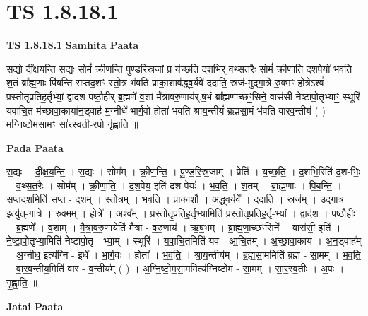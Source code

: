 \documentclass[17pt]{extarticle}
\begin{document}
\section{ TS 1.8.18.1 }

\textbf{TS 1.8.18.1 } \newline
\textbf{Samhita Paata} \newline

स॒द्यो दी᳚क्षयन्ति स॒द्यः सोमं॑ क्रीणन्ति पुण्डरिस्र॒जां प्र य॑च्छति द॒शभि॑र् वथ्सत॒रैः सोमं॑ क्रीणाति दश॒पेयो॑ भवति श॒तं ब्रा᳚ह्म॒णाः पि॑बन्ति सप्तद॒शꣳ स्तो॒त्रं भ॑वति प्राका॒शाव॑द्ध्व॒र्यवे॑ ददाति॒ स्रज॑-मुद्गा॒त्रे रु॒क्मꣳ होत्रेऽश्वं॑ प्रस्तोतृप्रतिह॒र्तृभ्यां॒ द्वाद॑श पष्ठौ॒हीर् ब्र॒ह्मणे॑ व॒शां मै᳚त्रावरु॒णाय॑र्.ष॒भं ब्रा᳚ह्मणाच्छꣳ॒॒सिने॒ वास॑सी नेष्टापो॒तृभ्याꣳ॒॒ स्थूरि॑ यवाचि॒त-म॑च्छावा॒काया॑न॒ड्वाह॑-म॒ग्नीधे॑ भार्ग॒वो होता॑ भवति श्राय॒न्तीयं॑ ब्रह्मसा॒मं भ॑वति वारव॒न्तीय॑ ( ) मग्निष्टोमसा॒मꣳ सा॑रस्व॒ती-र॒पो गृ॑ह्णाति ॥ \newline

\textbf{Pada Paata} \newline

स॒द्यः । दी॒क्ष॒य॒न्ति॒ । स॒द्यः । सोम᳚म् । क्री॒ण॒न्ति॒ । पु॒ण्ड॒रि॒स्र॒जाम् । प्रेति॑ । य॒च्छ॒ति॒ । द॒शभि॒रिति॑ द॒श-भिः॒ । व॒थ्स॒त॒रैः । सोम᳚म् । क्री॒णा॒ति॒ । द॒श॒पेय॒ इति॑ दश-पेयः॑ । भ॒व॒ति॒ । श॒तम् । ब्रा॒ह्म॒णाः । पि॒ब॒न्ति॒ । स॒प्त॒द॒शमिति॑ सप्त - द॒शम् । स्तो॒त्रम् । भ॒व॒ति॒ । प्रा॒का॒शौ । अ॒द्ध्व॒र्यवे᳚ । द॒दा॒ति॒ । स्रज᳚म् । उ॒द्गा॒त्र इत्यु॑त्-गा॒त्रे । रु॒क्मम् । होत्रे᳚ । अश्व᳚म् । प्र॒स्तो॒तृ॒प्र॒ति॒ह॒र्तृभ्या॒मिति॑ प्रस्तोतृप्रतिह॒र्तृ-भ्यां॒ । द्वाद॑श । प॒ष्ठौ॒हीः । ब्र॒ह्मणे᳚ । व॒शाम् । मै॒त्रा॒व॒रु॒णायेति॑ मैत्रा - व॒रु॒णाय॑ । ऋ॒ष॒भम् । ब्रा॒ह्म॒णा॒च्छꣳ॒॒सिने᳚ । वास॑सी॒ इति॑ । ने॒ष्टा॒पो॒तृभ्या॒मिति॑ नेष्टापो॒तृ - भ्या॒म् । स्थूरि॑ । य॒वा॒चि॒तमिति॑ यव - आ॒चि॒तम् । अ॒च्छा॒वा॒काय॑ । अ॒न॒ड्वाह᳚म् । अ॒ग्नीध॒ इत्य॑ग्नि - इधे᳚ । भा॒र्ग॒वः । होता᳚ । भ॒व॒ति॒ । श्रा॒य॒न्तीय᳚म् । ब्र॒ह्म॒सा॒ममिति॑ ब्रह्म - सा॒मम् । भ॒व॒ति॒ । वा॒र॒व॒न्तीय॒मिति॑ वार - व॒न्तीय᳚म् ( ) । अ॒ग्नि॒ष्टो॒म॒सा॒ममित्य॑ग्निष्टोम - सा॒मम् । सा॒र॒स्व॒तीः । अ॒पः । गृ॒ह्णा॒ति॒ ॥  \newline



\textbf{Jatai Paata} \newline
\end{document}
